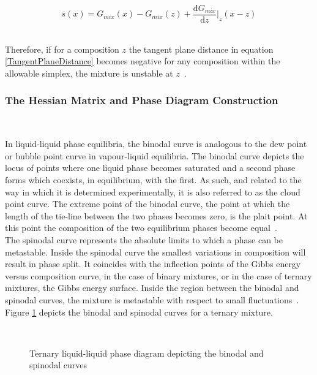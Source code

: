 \begin{equation}
s\left(x\right) = G_{mix}\left(x\right) -  G_{mix}\left(z\right) + \dfrac{\mathrm{d}G_{mix}}{\mathrm{d}z}\vert_{z}\left(x-z\right) \label{TangentPlaneDistance}
\end{equation}\

Therefore, if for a composition $z$ the tangent plane distance in equation \ref{TangentPlaneDistance} becomes negative for any composition within the allowable simplex, the mixture is unstable at $z$~\cite{ThermodynamicModels, PhaseEquilCalcsEasyandHard}.\

\subsubsection{The Hessian Matrix and Phase Diagram Construction}\
	
In liquid-liquid phase equilibria, the binodal curve is analogous to the dew point or bubble point curve in vapour-liquid equilibria. The binodal curve depicts the locus of points where one liquid phase becomes saturated and a second phase forms which coexists, in equilibrium, with the first. As such, and related to the way in which it is determined experimentally, it is also referred to as the cloud point curve. The extreme point of the binodal curve, the point at which the length of the tie-line between the two phases becomes zero, is the plait point. At this point the composition of the two equilibrium phases become equal~\cite{ChemicalBiochemicalEngineeringThermodynamics}.\\

The spinodal curve represents the absolute limits to which a phase can be metastable. Inside the spinodal curve the smallest variations in composition will result in phase split. It coincides with the inflection points of the Gibbs energy versus composition curve, in the case of binary mixtures, or in the case of ternary mixtures, the Gibbs energy surface. Inside the region between the binodal and spinodal curves, the mixture is metastable with respect to small fluctuations~\cite{ChemicalBiochemicalEngineeringThermodynamics}.\\

Figure \ref{BinodalSpinodalDrawing} depicts the binodal and spinodal curves for a ternary mixture.\\

\begin{figure}[t]
\begin{center}
\resizebox{0.7\textwidth}{!}{}\\
\end{center}
\caption{Ternary liquid-liquid phase diagram depicting the binodal and spinodal curves} \label{BinodalSpinodalDrawing}
\end{figure}	

